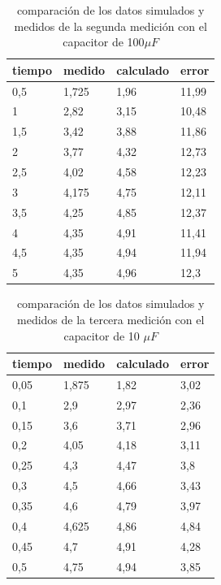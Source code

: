 \documentclass[journal]{IEEEtran}
\begin{document}
\begin{table}[]
	\centering
	\caption{comparación de los datos simulados y medidos de la segunda medición con el capacitor de 100\(\mu F\)}
	\label{Table:Medicion2}
	\begin{tabular}{|l|l|l|l|}
		\hline
		tiempo & medido & calculado & error \\ \hline
		0,5    & 1,725  & 1,96      & 11,99 \\ \hline
		1      & 2,82   & 3,15      & 10,48 \\ \hline
		1,5    & 3,42   & 3,88      & 11,86 \\ \hline
		2      & 3,77   & 4,32      & 12,73 \\ \hline
		2,5    & 4,02   & 4,58      & 12,23 \\ \hline
		3      & 4,175  & 4,75      & 12,11 \\ \hline
		3,5    & 4,25   & 4,85      & 12,37 \\ \hline
		4      & 4,35   & 4,91      & 11,41 \\ \hline
		4,5    & 4,35   & 4,94      & 11,94 \\ \hline
		5      & 4,35   & 4,96      & 12,3  \\ \hline
	\end{tabular}
\end{table}
\begin{table}[]
	\centering
	\caption{comparación de los datos simulados y medidos de la tercera medición con el capacitor de 10 \(\mu F\)}
	\label{Table:Medicion3}
	\begin{tabular}{|l|l|l|l|}
		\hline
		tiempo & medido & calculado & error \\ \hline
		0,05   & 1,875  & 1,82      & 3,02  \\ \hline
		0,1    & 2,9    & 2,97      & 2,36  \\ \hline
		0,15   & 3,6    & 3,71      & 2,96  \\ \hline
		0,2    & 4,05   & 4,18      & 3,11  \\ \hline
		0,25   & 4,3    & 4,47      & 3,8   \\ \hline
		0,3    & 4,5    & 4,66      & 3,43  \\ \hline
		0,35   & 4,6    & 4,79      & 3,97  \\ \hline
		0,4    & 4,625  & 4,86      & 4,84  \\ \hline
		0,45   & 4,7    & 4,91      & 4,28  \\ \hline
		0,5    & 4,75   & 4,94      & 3,85  \\ \hline
	\end{tabular}
\end{table}
\end{document}
